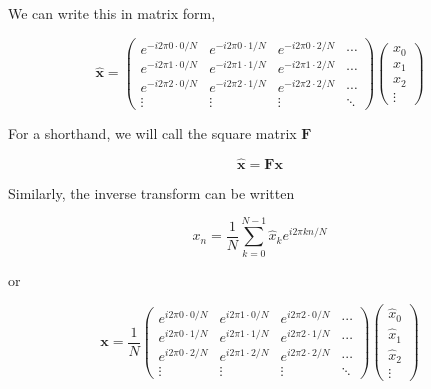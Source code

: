 \documentclass[12pt]{article}
\newcommand{\x}{\mathbf{x}}
\newcommand{\xhat}{\mathbf{\hat x}}
\newcommand{\F}{\mathbf{F}}
\begin{document}
\noindent We can write this in matrix form,

\begin{equation}
\xhat = \left( \begin{array}{cccc}
   e^{-i 2\pi 0 \cdot 0 / N} & e^{-i 2\pi 0\cdot 1 / N} & e^{-i 2\pi 0 \cdot 2 / N} & \cdots \\
   e^{-i 2\pi 1 \cdot 0 / N} & e^{-i 2\pi 1 \cdot1 / N} & e^{-i 2\pi 1 \cdot 2 / N} & \cdots \\
   e^{-i 2\pi 2 \cdot 0 / N} & e^{-i 2\pi 2 \cdot 1 / N} & e^{-i 2\pi 2 \cdot 2 / N} & \cdots \\
   \vdots & \vdots & \vdots & \ddots
   \end{array} \right)
   \left( \begin{array}{c} x_0 \\ x_1 \\ x_2 \\ \vdots \end{array} \right)
\end{equation}

\noindent For a shorthand, we will call the square matrix $\mathbf{F}$

\begin{equation}
\xhat = \F \x
\end{equation}

Similarly, the inverse transform can be written

\begin{equation}
x_n = \frac{1}{N} \sum_{k=0}^{N-1} \hat{x}_k e^{i 2 \pi k n / N}
\end{equation}

\noindent or

\begin{equation}
   \mathbf{x} = \frac{1}{N} \left( \begin{array}{cccc}
   e^{i 2\pi 0 \cdot 0 / N} & e^{i 2\pi 1 \cdot 0 / N} & e^{i 2\pi 2 \cdot 0 / N} & \cdots \\
   e^{i 2\pi 0 \cdot 1 / N} & e^{i 2\pi 1 \cdot 1 / N} & e^{i 2\pi 2 \cdot 1 / N} & \cdots \\
   e^{i 2\pi 0 \cdot 2 / N} & e^{i 2\pi 1 \cdot 2 / N} & e^{i 2\pi 2 \cdot 2 / N} & \cdots \\
   \vdots & \vdots & \vdots & \ddots
   \end{array} \right)
   \left( \begin{array}{c} \hat{x}_0 \\ \hat{x}_1 \\ \hat{x}_2 \\ \vdots \end{array} \right)
\end{equation}
\end{document}
